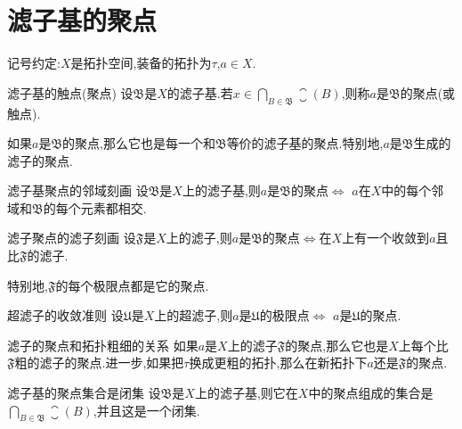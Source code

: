 \section{滤子基的聚点}

记号约定:$X$是拓扑空间,装备的拓扑为$\tau$,$a\in X$.

\begin{definition}{滤子基的触点(聚点)}{}
	设$\mathfrak{B}$是$X$的滤子基.若$x\in\bigcap\limits_{B\in\mathfrak{B}}\closure\left(B\right)$,则称$a$是$\mathfrak{B}$的聚点(或触点).
\end{definition}

\begin{remark}{}{}
	如果$a$是$\mathfrak{B}$的聚点,那么它也是每一个和$\mathfrak{B}$等价的滤子基的聚点.特别地,$a$是$\mathfrak{B}$生成的滤子的聚点.
\end{remark}

\begin{proposition}{滤子基聚点的邻域刻画}{}
	设$\mathfrak{B}$是$X$上的滤子基,则$a$是$\mathfrak{B}$的聚点$\iff$ $a$在$X$中的每个邻域和$\mathfrak{B}$的每个元素都相交.
\end{proposition}

\begin{proposition}{滤子聚点的滤子刻画}{}
	设$\mathfrak{F}$是$X$上的滤子,则$a$是$\mathfrak{B}$的聚点$\iff$在$X$上有一个收敛到$a$且比$\mathfrak{F}$的滤子.
\end{proposition}

\begin{remark}{}{}
	特别地,$\mathfrak{F}$的每个极限点都是它的聚点.
\end{remark}

\begin{corollary}{超滤子的收敛准则}{}
	设$\mathfrak{U}$是$X$上的超滤子,则$a$是$\mathfrak{U}$的极限点$\iff$ $a$是$\mathfrak{U}$的聚点.
\end{corollary}

\begin{remark}{滤子的聚点和拓扑粗细的关系}{}
	如果$a$是$X$上的滤子$\mathfrak{F}$的聚点,那么它也是$X$上每个比$\mathfrak{F}$粗的滤子的聚点.进一步,如果把$\tau$换成更粗的拓扑,那么在新拓扑下$a$还是$\mathfrak{F}$的聚点.
\end{remark}

\begin{proposition}{滤子基的聚点集合是闭集}{}
	设$\mathfrak{B}$是$X$上的滤子基,则它在$X$中的聚点组成的集合是$\bigcap\limits_{B\in\mathfrak{B}}\closure\left(B\right)$,并且这是一个闭集.
\end{proposition}

